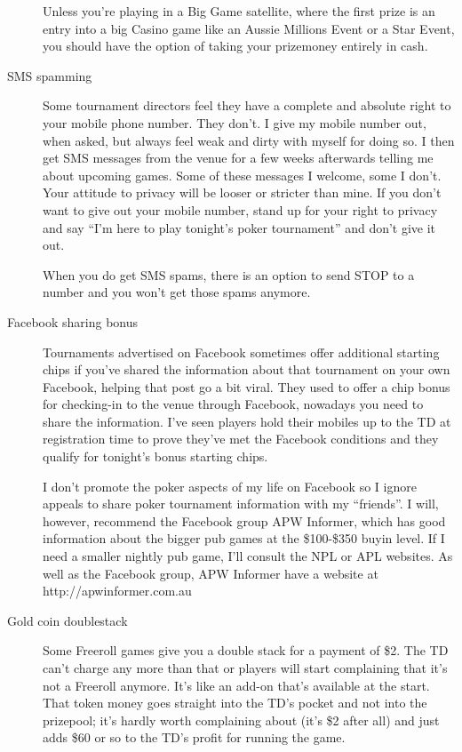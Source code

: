 \begin{description}
Unless you're playing in a Big Game satellite, where the first prize
is an entry into a big Casino game like an Aussie Millions Event or a
Star Event, you should have the option of taking your prizemoney
entirely in cash.

\item[SMS spamming] Some tournament directors feel they have a
complete and absolute right to your mobile phone number. They don't.
I give my mobile number out, when asked, but always feel weak and
dirty with myself for doing so. I then get SMS messages from the venue
for a few weeks afterwards telling me about upcoming games. Some of
these messages I welcome, some I don't. Your attitude to privacy will
be looser or stricter than mine. If you don't want to give out your
mobile number, stand up for your right to privacy and say ``I'm here
to play tonight's poker tournament'' and don't give it out.

When you do get SMS spams, there is an option to send STOP to a number
and you won't get those spams anymore.

\item[Facebook sharing bonus] Tournaments advertised on Facebook sometimes
offer additional starting chips if you've shared the information
about that tournament on your own Facebook, helping that post go
a bit viral. They used to offer a chip bonus for
checking-in to the venue through Facebook, nowadays you need to share
the information. I've seen players hold their mobiles up to the TD at
registration time to prove they've met the Facebook conditions and
they qualify for tonight's bonus starting chips.

I don't promote the poker aspects of my life on Facebook so I ignore
appeals to share poker tournament information with my ``friends''. I
will, however, recommend the Facebook group APW Informer, which has
good information about the bigger pub games at the \$100-\$350 buyin
level. If I need a smaller nightly pub game, I'll consult the NPL or
APL websites. As well as the Facebook group, APW Informer have a
website at http://apwinformer.com.au

\item[Gold coin doublestack] Some Freeroll games give you a double stack
for a payment of \$2. The TD can't charge any more than that or
players will start complaining that it's not a Freeroll anymore.
It's like an add-on that's available at the start. That token
money goes straight into the TD's pocket and not into the prizepool;
it's hardly worth complaining about (it's \$2 after all) and just adds
\$60 or so to the TD's profit for running the game.

\end{description}


